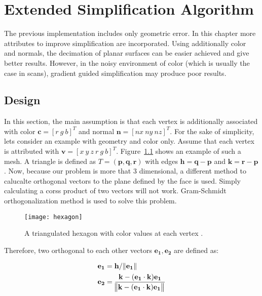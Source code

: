 \chapter{Extended Simplification Algorithm}

The previous implementation includes only geometric error. In this chapter more attributes to improve simplification are incorporated. Using additionally color and normals, the decimation of planar surfaces can be easier achieved and give better results. However, in the noisy environment of color (which is usually the case in scans), gradient guided simplification may produce poor results.

\section{Design}
In this section, the main assumption is that each vertex is additionally associated with color $\mathbf{c} = [r \ g \ b]^T$ and normal $\mathbf{n} = [nx \ ny \ nz]^T$. For the sake of simplicity, lets consider an example with geometry and color only. Assume that each vertex is attributed with $\mathbf{v} = [x \ y \ z \ r \ g \ b]^T$. Figure~\ref{fig:hexagon} shows an example of such a mesh. A triangle is defined as $T = (\mathbf{p}, \mathbf{q}, \mathbf{r})$ with edges $\mathbf{h} = \mathbf{q} - \mathbf{p}$ and $\mathbf{k} = \mathbf{r} - \mathbf{p}$. Now, because our problem is more that 3 dimensional, a different method to calucalte orthogonal vectors to the plane defined by the face is used. Simply calculating a corss product of two vectors will not work. Gram-Schmidt orthogonalization method \cite{strang88} is used to solve this problem.

\begin{figure}[H]
  \begin{center}
    \texttt{[image: hexagon]}
    \caption{A triangulated hexagon with color values at each vertex \cite{garland99}.}
    \label{fig:hexagon}
  \end{center}
\end{figure}

Therefore, two orthogonal to each other vectors $\mathbf{e_1}, \mathbf{e_2}$ are defined as:

\begin{align}
\mathbf{e_1} &= \mathbf{h} / \norm{\mathbf{e_1}} \\
\mathbf{e_2} &= \frac{\mathbf{k} - (\mathbf{e_1} \cdot \mathbf{k})\mathbf{e_1}}{\norm{\mathbf{k} - (\mathbf{e_1} \cdot \mathbf{k})\mathbf{e_1}}}
\end{align}


